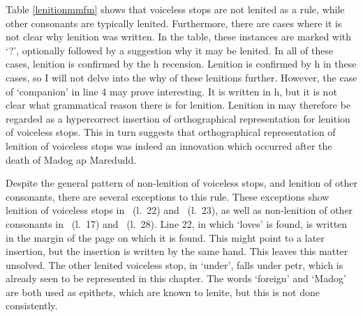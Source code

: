 Table \ref{lenitionmmfm} shows that voiceless stops are not lenited as a rule, while other consonants are typically lenited. Furthermore, there are cases where it is not clear why lenition was written. In the table, these instances are marked with `?', optionally followed by a suggestion why it may be lenited. In all of these cases, lenition is confirmed by the \gls{h} recension. Lenition is confirmed by \gls{h} in these cases, so I will not delve into the why of these lenitions further. However, the case of  `companion' in line 4 may prove interesting. It is written  in \gls{h}, but it is not clear what grammatical reason there is for lenition. Lenition in  may therefore be regarded as a hypercorrect insertion of orthographical representation for lenition of voiceless stops. This in turn suggests that orthographical representation of lenition of voiceless stops was indeed an innovation which occurred after the death of Madog ap Maredudd. 

Despite the general pattern of non-lenition of voiceless stops, and lenition of other consonants, there are several exceptions to this rule.
These exceptions show lenition of voiceless stops in ~(l.~22) and ~(l.~23), as well as non-lenition of other consonants in ~(l.~17) and ~(l.~28).
Line 22, in which  `loves' is found, is written in the margin of the page on which it is found.
This might point to a later insertion, but the insertion is written by the same hand.
This leaves this matter unsolved. The other lenited voiceless stop, in  `under', falls under \gls{petr}, which is already seen to be represented in this chapter.
The words  `foreign' and  `Madog' are both used as epithets, which are known to lenite, but this is not done consistently.

